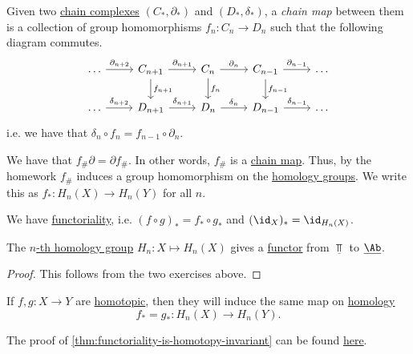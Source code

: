 \begin{definition}\label{def:chain-map}
	Given two \hyperref[def:chain-complex]{chain complexes} \((C_\ast, \partial_\ast)\) and \((D_\ast, \delta_\ast)\), a
	\emph{chain map} between them is a collection of group homomorphisms \(f_n \colon C_n \to D_n\) such that the following diagram commutes.
	\[
		\begin{tikzcd}
			\dots & {C_{n+1}} & {C_n} & {C_{n-1}} & \dots \\
			\dots & {D_{n+1}} & {D_n} & {D_{n-1}} & \dots
			\arrow["{\partial_{n+2}}", from=1-1, to=1-2]
			\arrow["{\delta_{n+2}}", from=2-1, to=2-2]
			\arrow["{\delta_{n+1}}", from=2-2, to=2-3]
			\arrow["{\delta_{n}}", from=2-3, to=2-4]
			\arrow["{\partial_{n-1}}", from=1-4, to=1-5]
			\arrow["{\partial_{n}}", from=1-3, to=1-4]
			\arrow["{\partial_{n+1}}", from=1-2, to=1-3]
			\arrow["{\delta_{n-1}}", from=2-4, to=2-5]
			\arrow["{f_{n-1}}", from=1-4, to=2-4]
			\arrow["{f_{n}}", from=1-3, to=2-3]
			\arrow["{f_{n+1}}", from=1-2, to=2-2]
		\end{tikzcd}
	\]
	i.e. we have that \(\delta_n \circ f_n = f_{n - 1} \circ \partial_n\).
\end{definition}

\begin{exercise}
	We have that \(f_{\#} \partial = \partial f_{\#}\). In other words, \(f_{\#}\) is a \hyperref[def:chain-map]{chain map}.
	Thus, by the homework \(f_{\#}\) induces a group homomorphism on the \hyperref[def:homology-group]{homology groups}. We write
	this as \(f_\ast \colon H_n(X) \to H_n(Y)\) for all \(n\).
\end{exercise}
\begin{exercise}
	We have \underline{functoriality}, i.e. \((f \circ g)_\ast = f_\ast \circ g_\ast\) and \((\id_X)_\ast = \id_{H_n(X)}\).
\end{exercise}

\begin{theorem}\label{thm:homology-group-defines-a-functor}
	The \hyperref[def:homology-group]{\(n\)-th homology group} \(H_n \colon X \mapsto H_n(X)\) gives a \hyperref[def:functor]{functor} from \(\underline{\Top}\)
	to \(\underline{\Ab }\).
\end{theorem}
\begin{proof}
	This follows from the two exercises above.
\end{proof}

\begin{theorem}\label{thm:functoriality-is-homotopy-invariant}
	If \(f, g\colon X \to Y\) are \hyperref[def:homotopic]{homotopic}, then they will induce the same map on \hyperref[def:homology-group]{homology}
	\[
		f_\ast = g_\ast \colon H_n(X) \to H_n(Y).
	\]
\end{theorem}
The proof of \autoref{thm:functoriality-is-homotopy-invariant} can be found \hyperref[pf:functoriality-is-homotopy-invariant]{here}.

